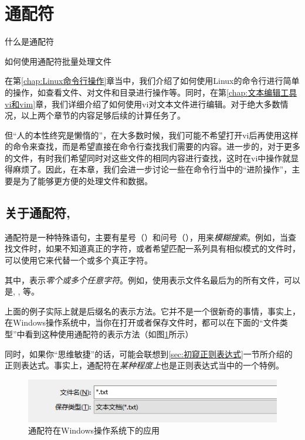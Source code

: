 \section{通配符}\label{sec:通配符}

\begin{Abstract}
    \item 什么是通配符
    \item 如何使用通配符批量处理文件
\end{Abstract}

在第\ref{chap:Linux命令行操作}章当中，我们介绍了如何使用Linux的命令行进行简单的操作，如查看文件、对文件和目录进行操作等。同时，在第\ref{chap:文本编辑工具vi和vim}章，我们详细介绍了如何使用vi对文本文件进行编辑。对于绝大多数情况，以上两个章节的内容足够后续的计算任务了。

但“人的本性终究是懒惰的”，在大多数时候，我们可能不希望打开vi后再使用\code{/}这样的命令来查找，而是希望直接在命令行查找我们需要的内容。进一步的，对于更多的文件，有时我们希望同时对这些文件的相同内容进行查找，这时在vi中操作就显得麻烦了。因此，在本章，我们会进一步讨论一些在命令行当中的“进阶操作”，主要是为了能够更方便的处理文件和数据。

\subsection{关于通配符\code{*}, }\label{subsec:通配符-关于通配符}

通配符是一种特殊语句，主要有星号（\keyword{*}）和问号（），用来\emph{模糊搜索}。例如，当查找文件时，如果不知道真正的字符，或者希望匹配一系列具有相似模式的文件时，可以使用它来代替一个或多个真正字符。

其中，\code{*}表示\emph{零个或多个任意字符}。例如，使用表示文件名最后为的所有文件，可以是, , 等。

\begin{extend}
    上面的例子实际上就是后缀名的表示方法。它并不是一个很新奇的事情，事实上，在Windows操作系统中，当你在打开或者保存文件时，都可以在下面的“文件类型”中看到这种使用通配符的表示方法（如图\ref{fig:通配符-通配符在Windows操作系统下的应用}所示）

    同时，如果你“思维敏捷”的话，可能会联想到\ref{sec:初窥正则表达式}一节所介绍的正则表达式。事实上，通配符在\emph{某种程度上}也是正则表达式当中的一个特例。

    \begin{figure}
        \centering
        \includegraphics[width=1\linewidth]{Linux基础/高级Linux命令/通配符/fig/通配符.png}
        \caption{通配符在Windows操作系统下的应用}
        \label{fig:通配符-通配符在Windows操作系统下的应用}
    \end{figure}
\end{extend}

